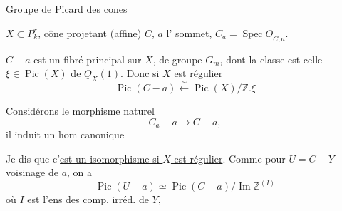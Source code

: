 \uline{Groupe de Picard des cones} \uline{}

$X\subset P_k^{r}$, cône projetant (affine) $C$, $a$ l' sommet, $C_a=\operatorname{Spec}\underline O_{C,a}$.

$C-a$ est un fibré principal sur $X$, de groupe $G_m$, dont la classe est celle $\xi\in\operatorname{Pic}(X)$ de $\underline O_X(1)$. Donc \uline{si} $X$ \uline{est régulier}
\[
\operatorname{Pic}(C-a)\xleftarrow{\sim}\operatorname{Pic}(X)/\mathbb Z.\xi
\]

Considérons le morphisme naturel
\[
C_a-a\longrightarrow C-a,
\]
il induit un hom canonique

Je dis que c'\uline{est un isomorphisme si $X$ est régulier}. Comme pour $U=C-Y$ voisinage de $a$, on a
\[
\operatorname{Pic}(U-a)\simeq\operatorname{Pic}(C-a)/\operatorname{Im}\mathbb Z^{(I)}
\]
où $I$ est l'ens des comp. irréd. de $Y$,
